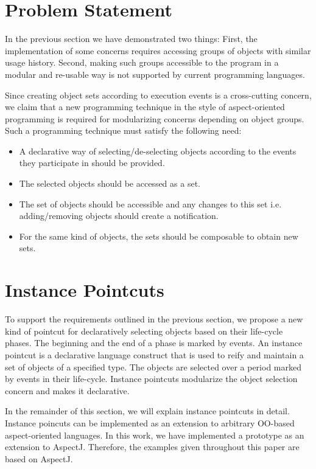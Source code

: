 \section{Problem Statement}
\label{sec:problem-statement}

In the previous section we have demonstrated two things: First, the implementation of some concerns requires accessing groups of objects with similar usage history.
Second, making such groups accessible to the program in a modular and re-usable way is not supported by current programming languages.

Since creating object sets according to execution events is a cross-cutting concern, we claim that a new programming technique in the style of aspect-oriented programming is required for modularizing concerns depending on object groups.
Such a programming technique must satisfy the following need:

\begin{itemize}
\item A declarative way of selecting/de-selecting objects according to the events they participate in should be provided.
\item The selected objects should be accessed as a set.
\item The set of objects should be accessible and any changes to this set i.e. adding/removing objects should create a notification.
\item For the same kind of objects, the sets should be composable to obtain new sets.
\end{itemize}

\section{Instance Pointcuts}
\label{sect:ip}
To support the requirements outlined in the previous section, we propose a new kind of pointcut for declaratively selecting objects based on their life-cycle phases. The beginning and the end of a phase is marked by events.
An instance pointcut is a declarative language construct that is used to reify and maintain a set of objects of a specified type. The objects are selected over a period marked by events in their life-cycle. Instance pointcuts modularize the object selection concern and makes it declarative.

In the remainder of this section, we will explain instance pointcuts in detail. Instance poincuts can be implemented as an extension to arbitrary OO-based aspect-oriented languages. In this work, we have implemented a prototype as an extension to AspectJ. Therefore, the examples given throughout this paper are based on AspectJ.

